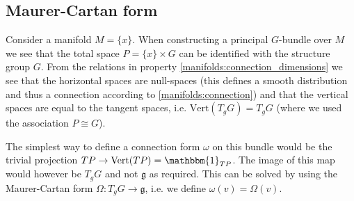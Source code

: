 	
\subsection{Maurer-Cartan form}

	
	\begin{definition}
		Consider a manifold $M = \{x\}$. When constructing a principal $G$-bundle over $M$ we see that the total space $P = \{x\}\times G$ can be identified with the structure group $G$. From the relations in property \ref{manifolds:connection_dimensions} we see that the horizontal spaces are null-spaces (this defines a smooth distribution and thus a connection according to \ref{manifolds:connection}) and that the vertical spaces are equal to the tangent spaces, i.e. $\text{Vert}(T_gG) = T_gG$ (where we used the association $P\cong G$).
		
		The simplest way to define a connection form $\omega$ on this bundle would be the trivial projection $TP\rightarrow\text{Vert}(TP) = \mathbbm{1}_{TP}$. The image of this map would however be $T_gG$ and not $\mathfrak{g}$ as required. This can be solved by using the Maurer-Cartan form $\Omega:T_gG\rightarrow\mathfrak{g}$, i.e. we define $\omega(v) = \Omega(v)$.
	\end{definition}
	

